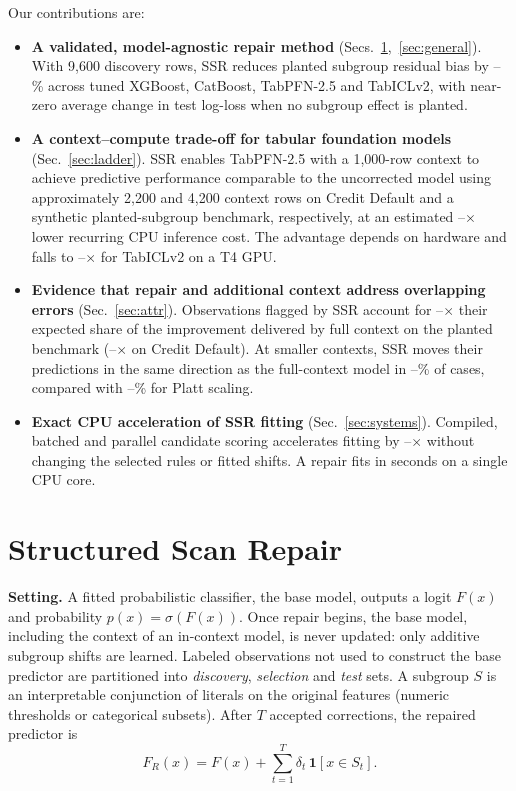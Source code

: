 \documentclass[conference]{IEEEtran}
\begin{document}
Our contributions are:
\begin{itemize}
\item \textbf{A validated, model-agnostic repair method} (Secs.~\ref{sec:method},~\ref{sec:general}).
With 9{,}600 discovery rows, SSR reduces planted subgroup residual bias by
\DBiasRedLo--\DBiasRedHi\% across tuned XGBoost, CatBoost, TabPFN-2.5 and TabICLv2, with near-zero
average change in test log-loss when no subgroup effect is planted.
\item \textbf{A context--compute trade-off for tabular foundation models} (Sec.~\ref{sec:ladder}).
SSR enables TabPFN-2.5 with a 1{,}000-row context to achieve predictive performance comparable to the
uncorrected model using approximately 2{,}200 and 4{,}200 context rows on Credit Default and a
synthetic planted-subgroup benchmark, respectively, at an estimated
\CrEqScanCpu--\PlEqScanCpu$\times$ lower recurring CPU inference cost. The advantage depends on
hardware and falls to \IclCrEqScanGpu--\IclPlEqScanGpu$\times$ for TabICLv2 on a T4 GPU.
\item \textbf{Evidence that repair and additional context address overlapping errors}
(Sec.~\ref{sec:attr}). Observations flagged by SSR account for \PlConcLo--\PlConcHi$\times$ their
expected share of the improvement delivered by full context on the planted benchmark
(\CrConcLo--\CrConcHi$\times$ on Credit Default). At smaller contexts, SSR moves their predictions in
the same direction as the full-context model in \CrSignLo--\CrSignHi\% of cases, compared with
\PlattSignLo--\PlattSignHi\% for Platt scaling.
\item \textbf{Exact CPU acceleration of SSR fitting} (Sec.~\ref{sec:systems}). Compiled, batched and
parallel candidate scoring accelerates fitting by \SpBatMin--\SpBatMax$\times$ without changing the
selected rules or fitted shifts. A repair fits in seconds on a single CPU core.
\end{itemize}

\section{Structured Scan Repair}\label{sec:method}
\textbf{Setting.} A fitted probabilistic classifier, the base model, outputs a logit $F(x)$ and probability
$p(x)=\sigma(F(x))$. Once repair begins, the base model, including the context of an in-context model,
is never updated: only additive subgroup shifts are learned. Labeled observations not used to construct the base predictor are partitioned
into \emph{discovery}, \emph{selection} and \emph{test} sets. A subgroup $S$ is an interpretable
conjunction of literals on the original features (numeric thresholds or categorical subsets). After
$T$ accepted corrections, the repaired predictor is
\begin{equation}\label{eq:repair}
F_R(x) = F(x) + \textstyle\sum_{t=1}^{T} \delta_t\, \mathbf{1}[x\in S_t].
\end{equation}
\end{document}
